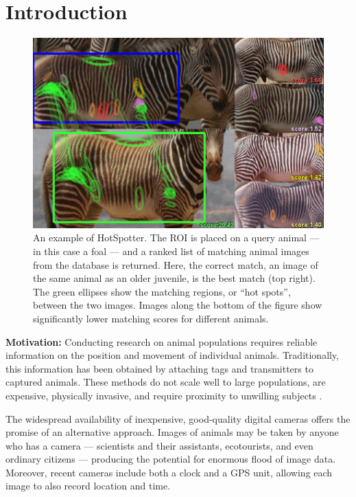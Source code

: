
\section {Introduction}

\begin{figure}
\centering
     \includegraphics[width=\linewidth] {figures/FinalImages/FoalSystemCropped.png}
\caption{\footnotesize{An example of HotSpotter. The ROI is placed on a
  query animal --- in this case a foal --- and a ranked list of
  matching animal images from the database is returned.  Here, the correct
  match, an image of the same animal as an older juvenile, is the best match
  (top right).  The green ellipses show the matching regions, or ``hot
  spots'', between the two images.  Images along the bottom of the
  figure show significantly lower matching scores for different animals.}}
\label{fig:onevsone}
\end{figure}


\textbf{Motivation:}
Conducting research on animal populations
requires reliable information on the position and movement of individual
animals.  Traditionally, this information has been obtained by
attaching tags and transmitters to captured animals.  These methods
do not scale well to large populations, are expensive, physically invasive, and require proximity to unwilling
subjects \cite{wsb94ElbinMicrochipIden, acmss04ZhangZebraNet}.

The widespread availability of inexpensive, good-quality digital
cameras offers the promise of an alternative approach.  Images of
animals may be taken by anyone who has a camera --- scientists and
their assistants, ecotourists, and even ordinary citizens ---
producing the potential for enormous flood of image data.
Moreover, recent cameras include both a clock and a GPS unit, allowing
each image to also record location and time.

